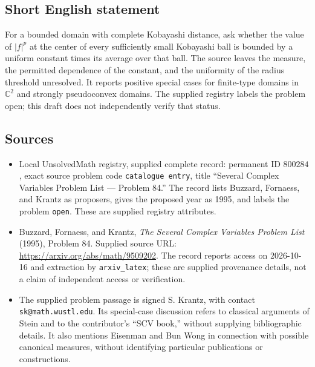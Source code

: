\documentclass[11pt]{article}
\newcommand{\C}{\mathbb{C}}
\begin{document}
\subsection{Short English statement}
For a bounded domain with complete Kobayashi distance, ask whether the value of \(|f|^p\) at the center of every sufficiently small Kobayashi ball is bounded by a uniform constant times its average over that ball. The source leaves the measure, the permitted dependence of the constant, and the uniformity of the radius threshold unresolved. It reports positive special cases for finite-type domains in \(\C^2\) and strongly pseudoconvex domains. The supplied registry labels the problem open; this draft does not independently verify that status.
\subsection{Sources}
\begin{itemize}
\item Local UnsolvedMath registry, supplied complete record: permanent ID \(800284\), exact source problem code \texttt{catalogue entry}, title ``Several Complex Variables Problem List --- Problem 84.'' The record lists Buzzard, Fornaess, and Krantz as proposers, gives the proposed year as 1995, and labels the problem \texttt{open}. These are supplied registry attributes.
\item Buzzard, Fornaess, and Krantz, \emph{The Several Complex Variables Problem List} (1995), Problem 84. Supplied source URL: \url{https://arxiv.org/abs/math/9509202}. The record reports access on 2026-10-16 and extraction by \texttt{arxiv\_latex}; these are supplied provenance details, not a claim of independent access or verification.
\item The supplied problem passage is signed S. Krantz, with contact \texttt{sk@math.wustl.edu}. Its special-case discussion refers to classical arguments of Stein and to the contributor's ``SCV book,'' without supplying bibliographic details. It also mentions Eisenman and Bun Wong in connection with possible canonical measures, without identifying particular publications or constructions.
\end{itemize}
\end{document}
